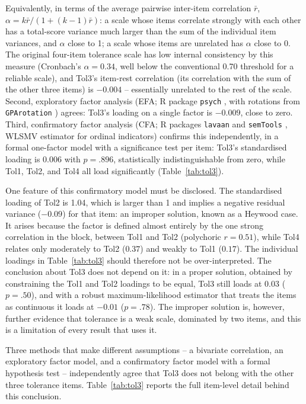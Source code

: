 Equivalently, in terms of the average pairwise inter-item correlation
$\bar{r}$, $\alpha = k\bar{r} / (1 + (k-1)\bar{r})$: a scale whose items
correlate strongly with each other has a total-score variance much larger
than the sum of the individual item variances, and $\alpha$ close to 1; a
scale whose items are unrelated has $\alpha$ close to 0. The original
four-item tolerance scale has low internal consistency by this measure
(Cronbach's $\alpha = 0.34$, well below the conventional 0.70 threshold for
a reliable scale), and Tol3's item-rest correlation (its correlation
with the sum of the other three items) is $-0.004$ -- essentially
unrelated to the rest of the scale. Second, exploratory factor analysis
(EFA; R package \texttt{psych} \citep{Rpsych}, with rotations from
\texttt{GPArotation} \citep{RGPArotation}) agrees:
Tol3's loading on a single factor is $-0.009$, close to zero. Third, confirmatory factor
analysis (CFA; R packages \texttt{lavaan} \citep{Rlavaan} and
\texttt{semTools} \citep{RsemTools}, WLSMV estimator for ordinal
indicators) confirms this independently, in a formal one-factor model with a
significance test per item: Tol3's standardised loading is 0.006 with
$p = .896$, statistically indistinguishable from zero, while Tol1, Tol2, and
Tol4 all load significantly (Table~\ref{tab:tol3}).

One feature of this confirmatory model must be disclosed. The standardised
loading of Tol2 is 1.04, which is larger than 1 and implies a negative
residual variance ($-0.09$) for that item: an improper solution, known as a
Heywood case. It arises because the factor is defined almost entirely by
the one strong correlation in the block, between Tol1 and Tol2 (polychoric
$r = 0.51$), while Tol4 relates only moderately to Tol2 ($0.37$) and weakly
to Tol1 ($0.17$). The individual loadings in Table~\ref{tab:tol3} should
therefore not be over-interpreted. The conclusion about Tol3 does not
depend on it: in a proper solution, obtained by constraining the Tol1 and
Tol2 loadings to be equal, Tol3 still loads at $0.03$ ($p = .50$), and with
a robust maximum-likelihood estimator that treats the items as continuous it
loads at $-0.01$ ($p = .78$). The improper solution is, however, further
evidence that tolerance is a weak scale, dominated by two items, and this is
a limitation of every result that uses it.

Three methods that make different assumptions -- a bivariate correlation, an
exploratory factor model, and a confirmatory factor model with a formal
hypothesis test -- independently agree that Tol3 does not belong with the
other three tolerance items. Table~\ref{tab:tol3} reports the
full item-level detail behind this conclusion.

